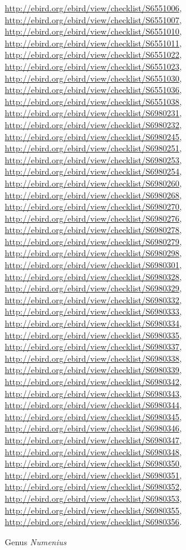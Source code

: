 \documentclass[9pt, article]{memoir}
\begin{document}
\begin{multicols}{2}
\url{http://ebird.org/ebird/view/checklist/S6551006}, 
\url{http://ebird.org/ebird/view/checklist/S6551007}, 
\url{http://ebird.org/ebird/view/checklist/S6551010}, 
\url{http://ebird.org/ebird/view/checklist/S6551011}, 
\url{http://ebird.org/ebird/view/checklist/S6551022}, 
\url{http://ebird.org/ebird/view/checklist/S6551023}, 
\url{http://ebird.org/ebird/view/checklist/S6551030}, 
\url{http://ebird.org/ebird/view/checklist/S6551036}, 
\url{http://ebird.org/ebird/view/checklist/S6551038}, 
\url{http://ebird.org/ebird/view/checklist/S6980231}, 
\url{http://ebird.org/ebird/view/checklist/S6980232}, 
\url{http://ebird.org/ebird/view/checklist/S6980245}, 
\url{http://ebird.org/ebird/view/checklist/S6980251}, 
\url{http://ebird.org/ebird/view/checklist/S6980253}, 
\url{http://ebird.org/ebird/view/checklist/S6980254}, 
\url{http://ebird.org/ebird/view/checklist/S6980260}, 
\url{http://ebird.org/ebird/view/checklist/S6980268}, 
\url{http://ebird.org/ebird/view/checklist/S6980270}, 
\url{http://ebird.org/ebird/view/checklist/S6980276}, 
\url{http://ebird.org/ebird/view/checklist/S6980278}, 
\url{http://ebird.org/ebird/view/checklist/S6980279}, 
\url{http://ebird.org/ebird/view/checklist/S6980298}, 
\url{http://ebird.org/ebird/view/checklist/S6980301}, 
\url{http://ebird.org/ebird/view/checklist/S6980328}, 
\url{http://ebird.org/ebird/view/checklist/S6980329}, 
\url{http://ebird.org/ebird/view/checklist/S6980332}, 
\url{http://ebird.org/ebird/view/checklist/S6980333}, 
\url{http://ebird.org/ebird/view/checklist/S6980334}, 
\url{http://ebird.org/ebird/view/checklist/S6980335}, 
\url{http://ebird.org/ebird/view/checklist/S6980337}, 
\url{http://ebird.org/ebird/view/checklist/S6980338}, 
\url{http://ebird.org/ebird/view/checklist/S6980339}, 
\url{http://ebird.org/ebird/view/checklist/S6980342}, 
\url{http://ebird.org/ebird/view/checklist/S6980343}, 
\url{http://ebird.org/ebird/view/checklist/S6980344}, 
\url{http://ebird.org/ebird/view/checklist/S6980345}, 
\url{http://ebird.org/ebird/view/checklist/S6980346}, 
\url{http://ebird.org/ebird/view/checklist/S6980347}, 
\url{http://ebird.org/ebird/view/checklist/S6980348}, 
\url{http://ebird.org/ebird/view/checklist/S6980350}, 
\url{http://ebird.org/ebird/view/checklist/S6980351}, 
\url{http://ebird.org/ebird/view/checklist/S6980352}, 
\url{http://ebird.org/ebird/view/checklist/S6980353}, 
\url{http://ebird.org/ebird/view/checklist/S6980355}, 
\url{http://ebird.org/ebird/view/checklist/S6980356}.

\vspace{6pt}\noindent\hspace{30pt}Genus \textit{Numenius}



\end{multicols}
\end{document}
